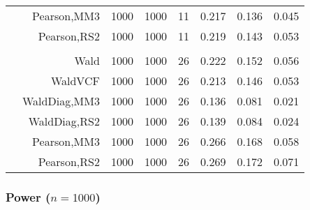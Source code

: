 \documentclass[
]{article}
\begin{document}
\begin{table}[H]
{\begin{tabular}[t]{lrrrrrrr}
\hspace{1em} & Pearson,MM3 & 1000 & 1000 & 11 & 0.217 & 0.136 & 0.045\\

\hspace{1em} & Pearson,RS2 & 1000 & 1000 & 11 & 0.219 & 0.143 & 0.053\\
\cmidrule{1-8}
\addlinespace[0.3em]
\multicolumn{8}{l}{\textbf{3F 15V}}\\
\hspace{1em} & Wald & 1000 & 1000 & 26 & 0.222 & 0.152 & 0.056\\

\hspace{1em} & WaldVCF & 1000 & 1000 & 26 & 0.213 & 0.146 & 0.053\\

\hspace{1em} & WaldDiag,MM3 & 1000 & 1000 & 26 & 0.136 & 0.081 & 0.021\\

\hspace{1em} & WaldDiag,RS2 & 1000 & 1000 & 26 & 0.139 & 0.084 & 0.024\\

\hspace{1em} & Pearson,MM3 & 1000 & 1000 & 26 & 0.266 & 0.168 & 0.058\\

\hspace{1em} & Pearson,RS2 & 1000 & 1000 & 26 & 0.269 & 0.172 & 0.071\\
\bottomrule
\end{tabular}}
\endgroup{}
\end{table}

\hypertarget{power-n1000}{%
\subsubsection{\texorpdfstring{Power
(\(n=1000\))}{Power (n=1000)}}\label{power-n1000}}
\end{document}
